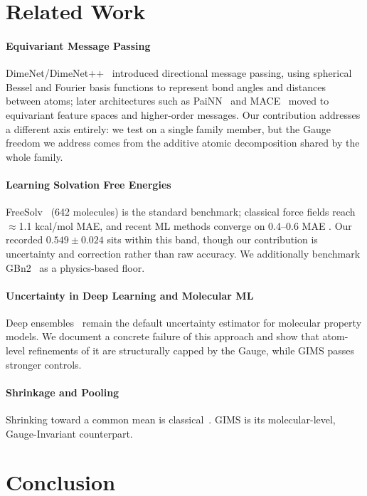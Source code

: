 \documentclass{article}
\begin{document}
\section{Related Work}

\paragraph{Equivariant Message Passing} DimeNet/DimeNet++~\cite{klicpera2020} introduced directional message passing, using spherical Bessel and Fourier basis functions to represent bond angles and distances between atoms; later architectures such as PaiNN~\cite{schutt2021} and
MACE~\cite{batatia2022} moved to equivariant feature spaces and
higher-order messages. Our contribution addresses a different axis entirely: we test on a single family member, but the Gauge freedom we address comes from the additive atomic decomposition shared by the whole family.

\paragraph{Learning Solvation Free Energies} FreeSolv~\cite{mobley2014freesolv}
(642 molecules) is the standard benchmark; classical force fields reach
$\approx$1.1 kcal/mol MAE, and recent ML methods converge on 0.4--0.6 MAE
\cite{zhang2022,vermeire2021,lim2021,sencosgem2026,roeckens2024}. Our
recorded $0.549 \pm 0.024$ sits within this band, though our contribution is
uncertainty and correction rather than raw accuracy. We additionally
benchmark GBn2~\cite{mongan2007} as a physics-based floor.

\paragraph{Uncertainty in Deep Learning and Molecular ML} Deep
ensembles~\cite{lakshminarayanan2017} remain the default uncertainty
estimator for molecular property models. We document a concrete failure of
this approach and show that atom-level refinements of it are structurally
capped by the Gauge, while GIMS passes stronger controls.

\paragraph{Shrinkage and Pooling} Shrinking toward a common mean is
classical~\cite{efron1977}. GIMS is its molecular-level, Gauge-Invariant
counterpart.

\section{Conclusion}
\end{document}

